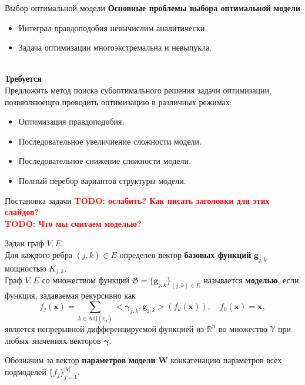 \documentclass[usenames,dvipsnames,11pt,pdf,utf8,russian,aspectratio=169]{beamer}
\begin{document}
\begin{frame}{Выбор оптимальной модели}
\textbf{Основные проблемы выбора оптимальной модели}\\
\begin{itemize}
\item Интеграл правдоподобия невычислим аналитически.
\item Задача оптимизации многоэкстремальна и невыпукла.
\end{itemize}
~\\
\textbf{Требуется}\\ 
Предложить метод поиска субоптимального решения задачи оптимизации, позвяоляюещго проводить оптимизацию в различных режимах:
\begin{itemize}
\item Оптимизация правдоподобия.
\item Последовательное увеличиение сложности модели.
\item Последовательное снижение сложности модели.
\item Полный перебор вариантов структуры модели.
\end{itemize}

\end{frame}       



\begin{frame}{ Постановка задачи}
\textcolor{red}{\textbf{TODO: ослабить? Как писать заголовки для этих слайдов?\\}}
\textcolor{red}{\textbf{TODO: Что мы считаем моделью?\\}}

Задан граф $V,E$. \\
Для каждого ребра $(j,k) \in E$ определен вектор \textbf{базовых функций} $\mathbf{g}_{j,k}$ мощностью $K_{j,k}$.\\
Граф $V, E$ со множеством функций $\mathfrak{G} = \{\mathbf{g}_{j,k}\}_{(j,k) \in E}$ называется \textbf{моделью}, если функция, задаваемая рекурсивно как 
\[
    f_j(\mathbf{x}) = \sum_{k \in \text{Adj}(v_j)} <\boldsymbol{\gamma}_{j,k}, \mathbf{g}_{j,k}> (f_{k}(\mathbf{x})), \quad     f_0(\mathbf{x}) = \mathbf{x},
\]
является непрерывной дифференцируемой функцией из $\mathbb{R}^n$ во множество $\mathbb{Y}$ при любых значениях векторов $\boldsymbol{\gamma}$.

Обозначим за вектор \textbf{параметров модели}  $\mathbf{W}$ конкатенацию параметров всех подмоделей $\{f_j\}_{j=1}^{|V|}$.
\end{frame}
\end{document}
